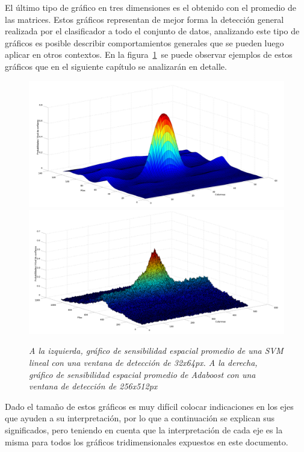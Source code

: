 El último tipo de gráfico en tres dimensiones es el obtenido con el promedio de las matrices. Estos gráficos representan de mejor forma la detección general realizada por el clasificador a todo el conjunto de datos, analizando este tipo de gráficos es posible describir comportamientos generales que se pueden luego aplicar en otros contextos. En la figura~\ref{fig:soutput}~se puede observar ejemplos de estos gráficos que en el siguiente capítulo se analizarán en detalle.

\begin{figure}[htc]
  \centering
  \includegraphics[scale=.16]{images/meansvmout32}
  \includegraphics[scale=.16]{images/meanboostout256}
  \caption{\em A la izquierda, gráfico de sensibilidad espacial promedio de una SVM lineal con una ventana de detección de 32x64px. A la derecha, gráfico de sensibilidad espacial promedio de Adaboost con una ventana de detección de 256x512px}  
  \label{fig:soutput}
\end{figure}


Dado el tamaño de estos gráficos es muy difícil colocar indicaciones en los ejes que ayuden a su interpretación,  por lo que a continuación se explican sus significados, pero teniendo en cuenta que la interpretación de cada eje es la misma para todos los gráficos tridimensionales expuestos en este documento.

